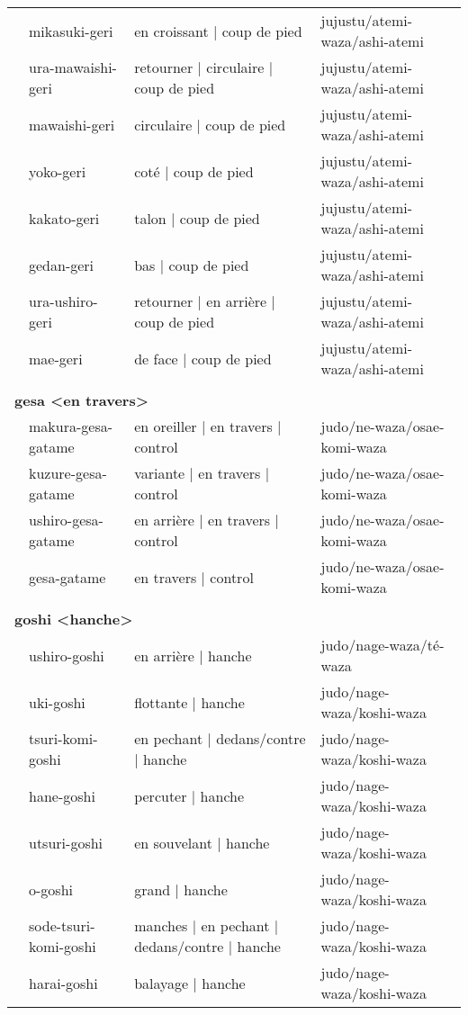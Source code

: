 \documentclass{article}%
\begin{document}
\begin{longtable}{rlll}
&mikasuki{-}geri&en croissant | coup de pied&jujustu/atemi{-}waza/ashi{-}atemi\\%
&ura{-}mawaishi{-}geri&retourner | circulaire | coup de pied&jujustu/atemi{-}waza/ashi{-}atemi\\%
&mawaishi{-}geri&circulaire | coup de pied&jujustu/atemi{-}waza/ashi{-}atemi\\%
&yoko{-}geri&coté | coup de pied&jujustu/atemi{-}waza/ashi{-}atemi\\%
&kakato{-}geri&talon | coup de pied&jujustu/atemi{-}waza/ashi{-}atemi\\%
&gedan{-}geri&bas | coup de pied&jujustu/atemi{-}waza/ashi{-}atemi\\%
&ura{-}ushiro{-}geri&retourner | en arrière | coup de pied&jujustu/atemi{-}waza/ashi{-}atemi\\%
&mae{-}geri&de face | coup de pied&jujustu/atemi{-}waza/ashi{-}atemi\\%
&&&\\%
\multicolumn{3}{l}{\textbf{gesa <en travers>}%
~%
}&\\%
&makura{-}gesa{-}gatame&en oreiller | en travers | control&judo/ne{-}waza/osae{-}komi{-}waza\\%
&kuzure{-}gesa{-}gatame&variante | en travers | control&judo/ne{-}waza/osae{-}komi{-}waza\\%
&ushiro{-}gesa{-}gatame&en arrière | en travers | control&judo/ne{-}waza/osae{-}komi{-}waza\\%
&gesa{-}gatame&en travers | control&judo/ne{-}waza/osae{-}komi{-}waza\\%
&&&\\%
\multicolumn{3}{l}{\textbf{goshi <hanche>}%
~%
}&\\%
&ushiro{-}goshi&en arrière | hanche&judo/nage{-}waza/té{-}waza\\%
&uki{-}goshi&flottante | hanche&judo/nage{-}waza/koshi{-}waza\\%
&tsuri{-}komi{-}goshi&en pechant | dedans/contre | hanche&judo/nage{-}waza/koshi{-}waza\\%
&hane{-}goshi&percuter | hanche&judo/nage{-}waza/koshi{-}waza\\%
&utsuri{-}goshi&en souvelant | hanche&judo/nage{-}waza/koshi{-}waza\\%
&o{-}goshi&grand | hanche&judo/nage{-}waza/koshi{-}waza\\%
&sode{-}tsuri{-}komi{-}goshi&manches | en pechant | dedans/contre | hanche&judo/nage{-}waza/koshi{-}waza\\%
&harai{-}goshi&balayage | hanche&judo/nage{-}waza/koshi{-}waza\\%

\end{longtable}
\end{document}
